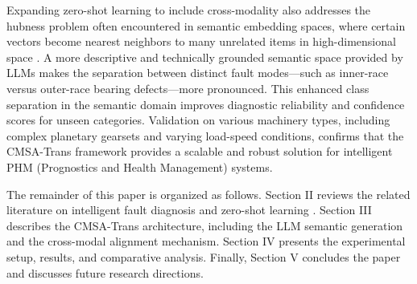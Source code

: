 Expanding zero-shot learning to include cross-modality also addresses the hubness problem often encountered in semantic embedding spaces, where certain vectors become nearest neighbors to many unrelated items in high-dimensional space \cite{radovanovic2010hubs}. A more descriptive and technically grounded semantic space provided by LLMs makes the separation between distinct fault modes---such as inner-race versus outer-race bearing defects---more pronounced. This enhanced class separation in the semantic domain improves diagnostic reliability and confidence scores for unseen categories. Validation on various machinery types, including complex planetary gearsets and varying load-speed conditions, confirms that the CMSA-Trans framework provides a scalable and robust solution for intelligent PHM (Prognostics and Health Management) systems.

The remainder of this paper is organized as follows. Section II reviews the related literature on intelligent fault diagnosis and zero-shot learning \cite{li2022zero}. Section III describes the CMSA-Trans architecture, including the LLM semantic generation and the cross-modal alignment mechanism. Section IV presents the experimental setup, results, and comparative analysis. Finally, Section V concludes the paper and discusses future research directions.
